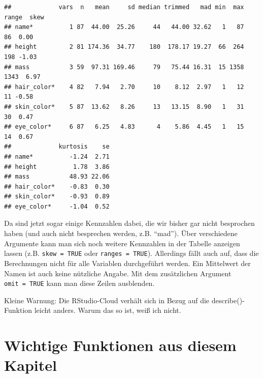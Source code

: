 \documentclass[
]{book}
\begin{document}
\begin{verbatim}
##             vars  n   mean     sd median trimmed   mad min  max range  skew
## name*          1 87  44.00  25.26     44   44.00 32.62   1   87    86  0.00
## height         2 81 174.36  34.77    180  178.17 19.27  66  264   198 -1.03
## mass           3 59  97.31 169.46     79   75.44 16.31  15 1358  1343  6.97
## hair_color*    4 82   7.94   2.70     10    8.12  2.97   1   12    11 -0.58
## skin_color*    5 87  13.62   8.26     13   13.15  8.90   1   31    30  0.47
## eye_color*     6 87   6.25   4.83      4    5.86  4.45   1   15    14  0.67
##             kurtosis    se
## name*          -1.24  2.71
## height          1.78  3.86
## mass           48.93 22.06
## hair_color*    -0.83  0.30
## skin_color*    -0.93  0.89
## eye_color*     -1.04  0.52
\end{verbatim}

Da sind jetzt sogar einige Kennzahlen dabei, die wir bisher gar nicht besprochen haben (und auch nicht besprechen werden, z.B. ``mad''). Über verschiedene Argumente kann man sich noch weitere Kennzahlen in der Tabelle anzeigen lassen (z.B. \texttt{skew\ =\ TRUE} oder \texttt{ranges\ =\ TRUE}). Allerdings fällt auch auf, dass die Berechnungen nicht für alle Variablen durchgeführt werden. Ein Mittelwert der Namen ist auch keine nützliche Angabe. Mit dem zusätzlichen Argument \texttt{omit\ =\ TRUE} kann man diese Zeilen ausblenden.

Kleine Warnung: Die RStudio-Cloud verhält sich in Bezug auf die describe()-Funktion leicht anders. Warum das so ist, weiß ich nicht.

\hypertarget{wichtige-funktionen-aus-diesem-kapitel-2}{%
\section*{Wichtige Funktionen aus diesem Kapitel}\label{wichtige-funktionen-aus-diesem-kapitel-2}}
\end{document}

